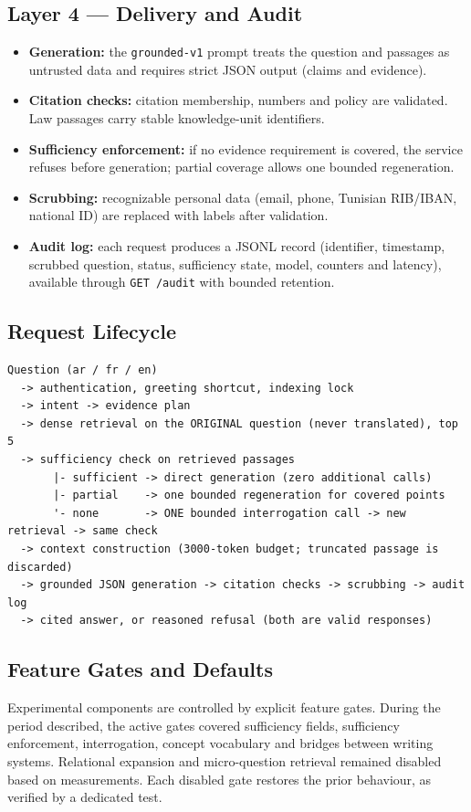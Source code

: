 \documentclass[a4paper,12pt,openany]{report}
\begin{document}
\subsection{Layer 4 — Delivery and Audit}
\begin{itemize}
  \item \textbf{Generation:} the \texttt{grounded-v1} prompt treats the question and passages as
untrusted data and requires strict JSON output (claims and evidence).
  \item \textbf{Citation checks:} citation membership, numbers and policy are validated. Law
passages carry stable knowledge-unit identifiers.
  \item \textbf{Sufficiency enforcement:} if no evidence requirement is covered, the service refuses
before generation; partial coverage allows one bounded regeneration.
  \item \textbf{Scrubbing:} recognizable personal data (email, phone, Tunisian RIB/IBAN, national ID)
are replaced with labels after validation.
  \item \textbf{Audit log:} each request produces a JSONL record (identifier, timestamp, scrubbed
question, status, sufficiency state, model, counters and latency), available through
\texttt{GET /audit} with bounded retention.
\end{itemize}

\subsection{Request Lifecycle}
\begin{verbatim}
Question (ar / fr / en)
  -> authentication, greeting shortcut, indexing lock
  -> intent -> evidence plan
  -> dense retrieval on the ORIGINAL question (never translated), top 5
  -> sufficiency check on retrieved passages
       |- sufficient -> direct generation (zero additional calls)
       |- partial    -> one bounded regeneration for covered points
       '- none       -> ONE bounded interrogation call -> new retrieval -> same check
  -> context construction (3000-token budget; truncated passage is discarded)
  -> grounded JSON generation -> citation checks -> scrubbing -> audit log
  -> cited answer, or reasoned refusal (both are valid responses)
\end{verbatim}

\subsection{Feature Gates and Defaults}
Experimental components are controlled by explicit feature gates. During the period described,
the active gates covered sufficiency fields, sufficiency enforcement, interrogation, concept
vocabulary and bridges between writing systems. Relational expansion and micro-question retrieval
remained disabled based on measurements. Each disabled gate restores the prior behaviour, as
verified by a dedicated test.
\end{document}
